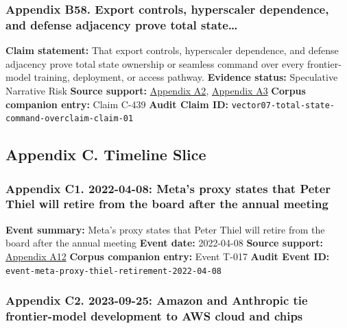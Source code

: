 \documentclass[
  american,
  11pt,
  letterpaper,
]{article}
\begin{document}
\subsubsection{Appendix B58. Export controls, hyperscaler dependence,
and defense adjacency prove total
state\ldots{}}\label{appendix-b58-export-controls-hyperscaler-dependence-and-defense-adjacency-prove-total-state}

\textbf{Claim statement:} That export controls, hyperscaler dependence,
and defense adjacency prove total state ownership or seamless command
over every frontier-model training, deployment, or access pathway.
\textbf{Evidence status:} Speculative Narrative Risk \textbf{Source
support:}
\hyperref[appendix-a2-guidance-regarding-enforcement-of-license-requirements-for-advanced-computing-items-for-entities-headquartered-in-country-group-d-5-and-macau]{Appendix
A2},
\hyperref[appendix-a3-amazon-and-anthropic-announce-strategic-collaboration-to-advance-generative-ai]{Appendix
A3} \textbf{Corpus companion entry:} Claim C-439 \textbf{Audit Claim
ID:} \texttt{vector07-total-state-command-overclaim-claim-01}

\subsection{Appendix C. Timeline
Slice}\label{appendix-c.-timeline-slice}

\subsubsection{Appendix C1. 2022-04-08: Meta's proxy states that Peter
Thiel will retire from the board after the annual
meeting}\label{appendix-c1-2022-04-08-meta-s-proxy-states-that-peter-thiel-will-retire-from-the-board-after-the-annual-meeting}

\textbf{Event summary:} Meta's proxy states that Peter Thiel will retire
from the board after the annual meeting \textbf{Event date:} 2022-04-08
\textbf{Source support:}
\hyperref[appendix-a12-meta-platforms-inc-2022-definitive-proxy-statement]{Appendix
A12} \textbf{Corpus companion entry:} Event T-017 \textbf{Audit Event
ID:} \texttt{event-meta-proxy-thiel-retirement-2022-04-08}

\subsubsection{Appendix C2. 2023-09-25: Amazon and Anthropic tie
frontier-model development to AWS cloud and
chips}\label{appendix-c2-2023-09-25-amazon-and-anthropic-tie-frontier-model-development-to-aws-cloud-and-chips}
\end{document}

